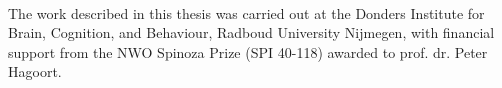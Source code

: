 \thispagestyle{empty}

{\setlength{\parindent}{0cm}
\begin{flushright}
\vspace{120pt}
\\
\vspace{80pt}
\end{flushright}
}

\newpage

\thispagestyle{empty}
{\setlength{\parindent}{0cm}\raggedright\smaller
\null\vfill

The work described in this thesis was carried out at the Donders Institute for Brain, Cognition, and Behaviour, Radboud University Nijmegen, with financial support from the NWO Spinoza Prize (SPI 40-118) awarded to prof. dr. Peter Hagoort.

\vspace{12pt}


\vspace{12pt}


\vspace{12pt}

}


\thispagestyle{empty}
%
%
%
%
%
\thispagestyle{empty}

